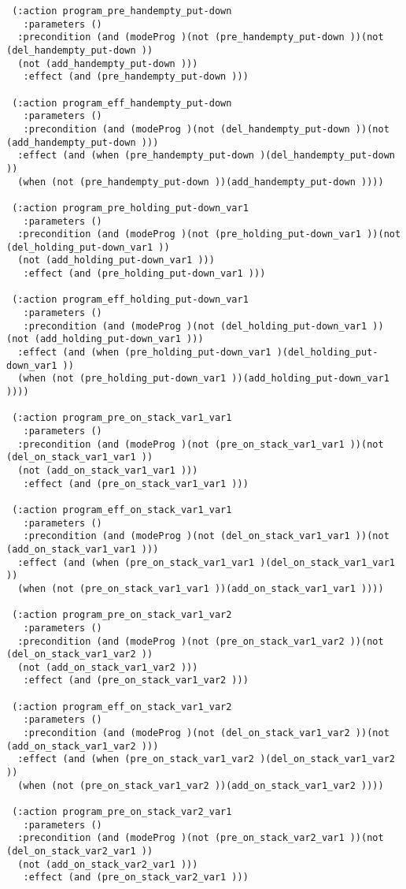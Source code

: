 \begin{scriptsize}
\begin{verbatim}
 (:action program_pre_handempty_put-down
   :parameters ()
  :precondition (and (modeProg )(not (pre_handempty_put-down ))(not (del_handempty_put-down ))
  (not (add_handempty_put-down )))
   :effect (and (pre_handempty_put-down )))

 (:action program_eff_handempty_put-down
   :parameters ()
   :precondition (and (modeProg )(not (del_handempty_put-down ))(not (add_handempty_put-down )))
  :effect (and (when (pre_handempty_put-down )(del_handempty_put-down ))
  (when (not (pre_handempty_put-down ))(add_handempty_put-down ))))

 (:action program_pre_holding_put-down_var1
   :parameters ()
  :precondition (and (modeProg )(not (pre_holding_put-down_var1 ))(not (del_holding_put-down_var1 ))
  (not (add_holding_put-down_var1 )))
   :effect (and (pre_holding_put-down_var1 )))

 (:action program_eff_holding_put-down_var1
   :parameters ()
   :precondition (and (modeProg )(not (del_holding_put-down_var1 ))(not (add_holding_put-down_var1 )))
  :effect (and (when (pre_holding_put-down_var1 )(del_holding_put-down_var1 ))
  (when (not (pre_holding_put-down_var1 ))(add_holding_put-down_var1 ))))

 (:action program_pre_on_stack_var1_var1
   :parameters ()
  :precondition (and (modeProg )(not (pre_on_stack_var1_var1 ))(not (del_on_stack_var1_var1 ))
  (not (add_on_stack_var1_var1 )))
   :effect (and (pre_on_stack_var1_var1 )))

 (:action program_eff_on_stack_var1_var1
   :parameters ()
   :precondition (and (modeProg )(not (del_on_stack_var1_var1 ))(not (add_on_stack_var1_var1 )))
  :effect (and (when (pre_on_stack_var1_var1 )(del_on_stack_var1_var1 ))
  (when (not (pre_on_stack_var1_var1 ))(add_on_stack_var1_var1 ))))

 (:action program_pre_on_stack_var1_var2
   :parameters ()
  :precondition (and (modeProg )(not (pre_on_stack_var1_var2 ))(not (del_on_stack_var1_var2 ))
  (not (add_on_stack_var1_var2 )))
   :effect (and (pre_on_stack_var1_var2 )))

 (:action program_eff_on_stack_var1_var2
   :parameters ()
   :precondition (and (modeProg )(not (del_on_stack_var1_var2 ))(not (add_on_stack_var1_var2 )))
  :effect (and (when (pre_on_stack_var1_var2 )(del_on_stack_var1_var2 ))
  (when (not (pre_on_stack_var1_var2 ))(add_on_stack_var1_var2 ))))

 (:action program_pre_on_stack_var2_var1
   :parameters ()
  :precondition (and (modeProg )(not (pre_on_stack_var2_var1 ))(not (del_on_stack_var2_var1 ))
  (not (add_on_stack_var2_var1 )))
   :effect (and (pre_on_stack_var2_var1 )))


\end{verbatim}
\end{scriptsize}
